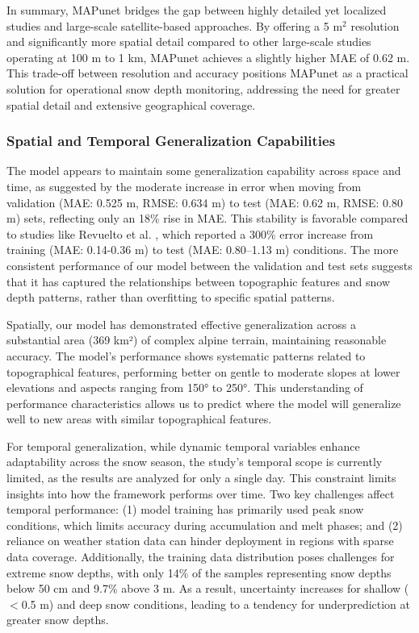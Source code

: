 \documentclass[preprint,12pt]{elsarticle}
\begin{document}
{In summary, MAPunet bridges the gap between highly detailed yet localized studies and large-scale satellite-based approaches. By offering a 5 m$^2$ resolution and significantly more spatial detail compared to other large-scale studies operating at 100 m to 1 km, MAPunet achieves a slightly higher MAE of 0.62 m. This trade-off between resolution and accuracy positions MAPunet as a practical solution for operational snow depth monitoring, addressing the need for greater spatial detail and extensive geographical coverage.

\subsubsection{Spatial and Temporal Generalization Capabilities}

The model appears to maintain some generalization capability across space and time, as suggested by the moderate increase in error when moving from validation (MAE: 0.525 m, RMSE: 0.634 m) to test (MAE: 0.62 m, RMSE: 0.80 m) sets, reflecting only an 18\% rise in MAE. This stability is favorable compared to studies like Revuelto et al. \cite{revuelto2020random}, which reported a 300\% error increase from training (MAE: 0.14-0.36 m) to test (MAE: 0.80--1.13 m) conditions. The more consistent performance of our model between the validation and test sets suggests that it has captured the relationships between topographic features and snow depth patterns, rather than overfitting to specific spatial patterns.

Spatially, our model has demonstrated effective generalization across a substantial area (369 km²) of complex alpine terrain, maintaining reasonable accuracy. The model's performance shows systematic patterns related to topographical features, performing better on gentle to moderate slopes at lower elevations and aspects ranging from 150° to 250°. This understanding of performance characteristics allows us to predict where the model will generalize well to new areas with similar topographical features.

For temporal generalization, while dynamic temporal variables enhance adaptability across the snow season, the study's temporal scope is currently limited, as the results are analyzed for only a single day. This constraint limits insights into how the framework performs over time. Two key challenges affect temporal performance: (1) model training has primarily used peak snow conditions, which limits accuracy during accumulation and melt phases; and (2) reliance on weather station data can hinder deployment in regions with sparse data coverage. Additionally, the training data distribution poses challenges for extreme snow depths, with only 14\% of the samples representing snow depths below 50 cm and 9.7\% above 3 m. As a result, uncertainty increases for shallow ($<$0.5 m) and deep snow conditions, leading to a tendency for underprediction at greater snow depths.

}
\end{document}
